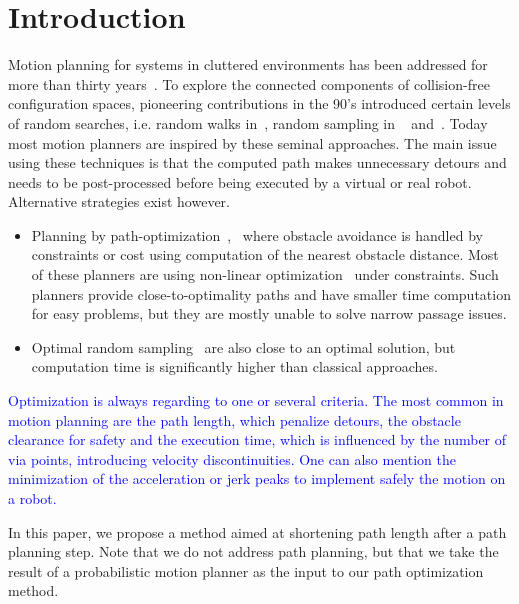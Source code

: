 \documentclass{tADR2e}
\begin{document}
\section{Introduction}
Motion planning for systems in cluttered environments has been addressed for more
than thirty years~\cite{ref-motionplan}. 
To explore the connected components of collision-free configuration spaces, pioneering 
contributions in the 90’s introduced certain levels of random searches, i.e. random walks in~\cite{potentielBarraquandLatombe}, random sampling in 
~\cite{KavrakiLatombePRM} and~\cite{LaValleKuffnerRRT}. Today most motion planners are inspired by these seminal approaches.
The main issue using these techniques is that the computed path makes unnecessary 
detours and needs to be post-processed before being executed by a virtual or real 
robot. Alternative strategies exist however.
\begin{itemize}
\item Planning by path-optimization~\cite{itomp2012},~\cite{voronoiOMP} where
obstacle avoidance is handled by constraints or cost using computation of the
nearest obstacle distance. Most of these planners are using non-linear
optimization~\cite{BettsNonlinopt} under constraints. Such planners provide close-to-optimality paths and have smaller time computation
for easy problems, but they are mostly unable to solve narrow passage issues.
 
\item Optimal random sampling~\cite{KaramanPRMstarRRTstar} are also close to an
optimal solution, but computation time is significantly higher than classical
approaches.
\end{itemize}

\textcolor{blue}{Optimization is always regarding to one or several criteria. The most common in motion planning are the path length, which penalize detours, the obstacle clearance for safety and the execution time, which is influenced by the number of via points, introducing velocity discontinuities. One can also mention the minimization of the acceleration or jerk peaks to implement safely the motion on a robot.}

In this paper, we propose a method aimed at shortening path length after a path
planning step. Note that we do not address path planning, but that we take the
result of a probabilistic motion planner as the input to our path optimization 
method.
\end{document}
